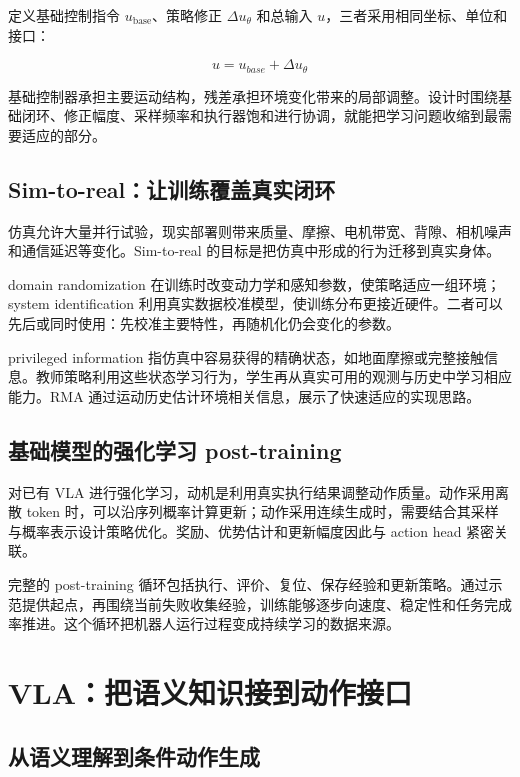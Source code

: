 \documentclass[UTF8,a4paper,11pt,oneside,openany,fontset=none]{ctexbook}
\begin{document}
定义基础控制指令 \(u_{\mathrm{base}}\)、策略修正 \(\Delta\)\(u_{\theta }\) 和总输入 \(u\)，三者采用相同坐标、单位和接口：

\[
u=u_{base}+\Delta u_\theta
\]

基础控制器承担主要运动结构，残差承担环境变化带来的局部调整。设计时围绕基础闭环、修正幅度、采样频率和执行器饱和进行协调，就能把学习问题收缩到最需要适应的部分。

\section{Sim-to-real：让训练覆盖真实闭环}\label{sim-to-realux8ba9ux8badux7ec3ux8986ux76d6ux771fux5b9eux95edux73af}

仿真允许大量并行试验，现实部署则带来质量、摩擦、电机带宽、背隙、相机噪声和通信延迟等变化。Sim-to-real 的目标是把仿真中形成的行为迁移到真实身体。

domain randomization 在训练时改变动力学和感知参数，使策略适应一组环境；system identification 利用真实数据校准模型，使训练分布更接近硬件。二者可以先后或同时使用：先校准主要特性，再随机化仍会变化的参数。

privileged information 指仿真中容易获得的精确状态，如地面摩擦或完整接触信息。教师策略利用这些状态学习行为，学生再从真实可用的观测与历史中学习相应能力。RMA 通过运动历史估计环境相关信息，展示了快速适应的实现思路。\cite{R05}

\section{基础模型的强化学习 post-training}

对已有 VLA 进行强化学习，动机是利用真实执行结果调整动作质量。动作采用离散 token 时，可以沿序列概率计算更新；动作采用连续生成时，需要结合其采样与概率表示设计策略优化。奖励、优势估计和更新幅度因此与 action head 紧密关联。

完整的 post-training 循环包括执行、评价、复位、保存经验和更新策略。通过示范提供起点，再围绕当前失败收集经验，训练能够逐步向速度、稳定性和任务完成率推进。这个循环把机器人运行过程变成持续学习的数据来源。

\chapter{VLA：把语义知识接到动作接口}

\section{从语义理解到条件动作生成}
\end{document}
